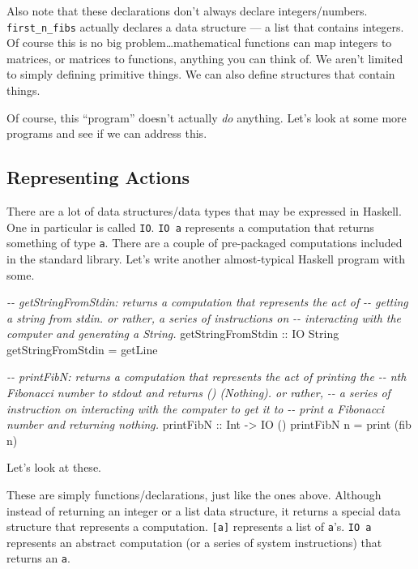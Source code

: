 \documentclass[]{article}
\newenvironment{Shaded}{}{}
\newcommand{\CommentTok}[1]{\textcolor[rgb]{0.38,0.63,0.69}{\textit{#1}}}
\newcommand{\DataTypeTok}[1]{\textcolor[rgb]{0.56,0.13,0.00}{#1}}
\newcommand{\FunctionTok}[1]{\textcolor[rgb]{0.02,0.16,0.49}{#1}}
\newcommand{\NormalTok}[1]{#1}
\newcommand{\OtherTok}[1]{\textcolor[rgb]{0.00,0.44,0.13}{#1}}
\begin{document}
Also note that these declarations don't always declare integers/numbers.
\texttt{first\_n\_fibs} actually declares a data structure --- a list that
contains integers. Of course this is no big problem\ldots mathematical functions
can map integers to matrices, or matrices to functions, anything you can think
of. We aren't limited to simply defining primitive things. We can also define
structures that contain things.

Of course, this ``program'' doesn't actually \emph{do} anything. Let's look at
some more programs and see if we can address this.

\subsection{Representing Actions}\label{representing-actions}

There are a lot of data structures/data types that may be expressed in Haskell.
One in particular is called \texttt{IO}. \texttt{IO\ a} represents a computation
that returns something of type \texttt{a}. There are a couple of pre-packaged
computations included in the standard library. Let's write another
almost-typical Haskell program with some.

\begin{Shaded}
\begin{Highlighting}[]
\CommentTok{{-}{-}  getStringFromStdin: returns a computation that represents the act of}
\CommentTok{{-}{-}      getting a string from stdin.  or rather, a series of instructions on}
\CommentTok{{-}{-}      interacting with the computer and generating a String.}
\OtherTok{getStringFromStdin ::} \DataTypeTok{IO} \DataTypeTok{String}
\NormalTok{getStringFromStdin }\OtherTok{=} \FunctionTok{getLine}

\CommentTok{{-}{-}  printFibN: returns a computation that represents the act of printing the}
\CommentTok{{-}{-}      nth Fibonacci number to stdout and returns () (Nothing).  or rather,}
\CommentTok{{-}{-}      a series of instruction on interacting with the computer to get it to}
\CommentTok{{-}{-}      print a Fibonacci number and returning nothing.}
\OtherTok{printFibN ::} \DataTypeTok{Int} \OtherTok{{-}\textgreater{}} \DataTypeTok{IO}\NormalTok{ ()}
\NormalTok{printFibN n }\OtherTok{=} \FunctionTok{print}\NormalTok{ (fib n)}
\end{Highlighting}
\end{Shaded}

Let's look at these.

These are simply functions/declarations, just like the ones above. Although
instead of returning an integer or a list data structure, it returns a special
data structure that represents a computation. \texttt{{[}a{]}} represents a list
of \texttt{a}'s. \texttt{IO\ a} represents an abstract computation (or a series
of system instructions) that returns an \texttt{a}.
\end{document}
